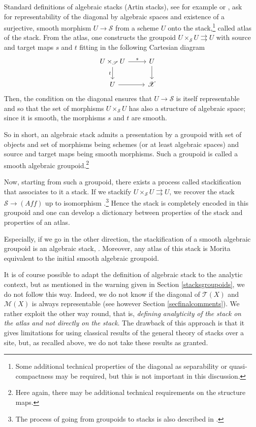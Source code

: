 \documentclass[10pt]{amsart}
\let\mathcal\mathscr
\newcommand{\Aff}{\mathit{Aff}}
\theoremstyle{plain}
\theoremstyle{definition}
\theoremstyle{remark}
\numberwithin{equation}{section}
\newcommand{\T}{\mathcal T(X)}
\begin{document}
Standard definitions of algebraic stacks (Artin stacks), see for example \cite[Def.\,86.12.1]{Stacksproject} or \cite[Def.\,15.9]{BCEFFGK}, ask for representability of the diagonal by algebraic spaces and existence of a surjective, smooth morphism $U\to\mathcal S$ from a scheme $U$ onto the stack,\footnote{Some additional technical properties of the diagonal as separability or quasi-compactness may be required, but this is not important in this discussion.} called atlas of the stack. From the atlas, one constructs the groupoid $U\times_{\mathcal S}U\rightrightarrows U$ with source and target maps $s$ and $t$ fitting in the following Cartesian diagram
\begin{equation}
\label{symgroup}
\begin{tikzcd}
U\times_{\mathcal S}U \arrow[d,"t"']\arrow[r,"s"]&U\arrow[d]\\
U \arrow[r]&\mathcal X
\end{tikzcd}
\end{equation}
Then, the condition on the diagonal ensures that $U\to\mathcal S$ is itself representable and so that the set of morphisms $U\times_{\mathcal S}U$ has also a structure of algebraic space; since it is smooth, the morphisms $s$ and $t$ are smooth.

So in short, an algebraic stack admits a presentation by a groupoid with set of \hbox{objects} and set of morphisms being schemes (or at least algebraic spaces) and source and target maps being smooth morphisms. Such a groupoid is called a smooth algebraic groupoid.\footnote{Here again, there may be additional technical requirements on the structure maps.}

Now, starting from such a groupoid, there exists a process called stackification that associates to it a stack. If we stackify $U\times_{\mathcal S}U\rightrightarrows U$, we recover the stack $\mathcal S\to (\Aff)$ up to isomorphism \cite[Prop.\,15.19]{BCEFFGK}.\footnote{The process of going from groupoids to stacks is also described in \cite[\S 3.4.3]{LMB}.} Hence the stack is completely encoded in this groupoid and one can develop a dictionary between properties of the stack and properties of an atlas.

Especially, if we go in the other direction, the stackification of a smooth algebraic groupoid is an algebraic stack, \cite[Prop.\,15.18]{BCEFFGK}. Moreover, any atlas of this stack is Morita equivalent to the initial smooth algebraic groupoid.

It is of course possible to adapt the definition of algebraic stack to the analytic context, but as mentioned in the warning given in Section \ref{stacksgroupoids}, we do not follow this way. Indeed, we do not know if the diagonal of $\T$ and $\mathcal M(X)$ is always representable (see however Section \ref{secfinalcomments}). We rather exploit the other way round, that is, \emph{defining analyticity of the stack on the atlas and not directly on the stack}. The drawback of this approach is that it gives limitations for using classical results of the general theory of stacks over a site, but, as recalled above, we do not take these results as granted.
\end{document}

